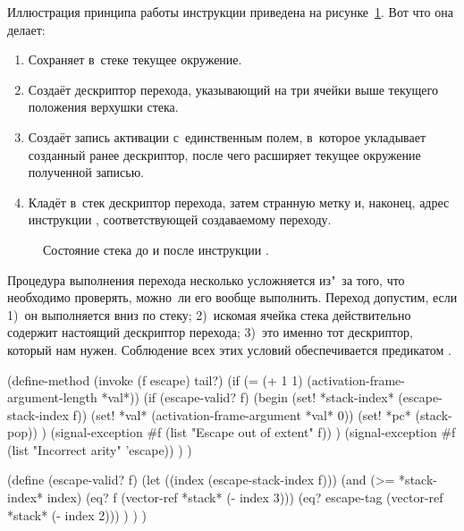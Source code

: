 
Иллюстрация принципа работы инструкции  приведена
на рисунке~\ref{compilation/escapes/pic:push-escaper}. Вот что она делает:

\begin{enumerate}
  \item Сохраняет в~стеке текущее окружение.

  \item Создаёт дескриптор перехода, указывающий на
        три ячейки выше текущего положения верхушки стека.

  \item Создаёт запись активации с~единственным полем, в~которое
        укладывает созданный ранее дескриптор, после чего расширяет
        текущее окружение полученной записью.

  \item Кладёт в~стек дескриптор перехода, затем странную
        метку  и, наконец, адрес инструкции
        , соответствующей создаваемому
        переходу.
\end{enumerate}

\begin{figure}[tb]\centering

\caption{Состояние стека до и после инструкции \protect{}.}%
\label{compilation/escapes/pic:push-escaper}%
\end{figure}

Процедура выполнения перехода несколько усложняется из"~за того, что необходимо
проверять, можно~ли его вообще выполнить. Переход допустим, если 1)~он
выполняется вниз по стеку; 2)~искомая ячейка стека действительно содержит
настоящий дескриптор перехода; 3)~это именно тот дескриптор, который нам нужен.
Соблюдение всех этих условий обеспечивается предикатом .

\begin{code:lisp}
(define-method (invoke (f escape) tail?)
  (if (= (+ 1 1) (activation-frame-argument-length *val*))
      (if (escape-valid? f)
          (begin (set! *stack-index* (escape-stack-index f))
                 (set! *val* (activation-frame-argument *val* 0))
                 (set! *pc* (stack-pop)) )
          (signal-exception #f (list "Escape out of extent" f)) )
      (signal-exception #f (list "Incorrect arity" 'escape)) ) )

(define (escape-valid? f)
  (let ((index (escape-stack-index f)))
    (and (>= *stack-index* index)
         (eq? f (vector-ref *stack* (- index 3)))
         (eq? escape-tag (vector-ref *stack* (- index 2))) ) ) )
\end{code:lisp}

